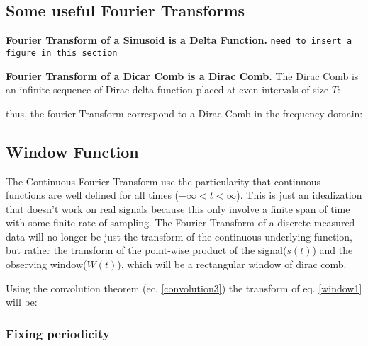\subsection{Some useful Fourier Transforms}{\label{subsec_ftusefull}}
\begin{description}
	\item \textbf{Fourier Transform of a Sinusoid is a Delta Function.} \texttt{need to insert a figure in this section}
	
	\item \textbf{Fourier Transform of a Dicar Comb is a Dirac Comb.} The Dirac Comb is an infinite sequence of Dirac delta function placed at even intervals of size $T$:	

	
	thus, the fourier Transform correspond to a Dirac Comb in the frequency domain:
	

\end{description}

\subsection{Window Function}{\label{subsec_window}}
\newp The Continuous Fourier Transform use the particularity that continuous functions are well defined for all times ($-\infty < t < \infty$). This is just an idealization that doesn't work on real signals because this only involve a finite span of time with some finite rate of sampling. The Fourier Transform of a discrete measured data will no longer be just the transform of the continuous underlying function, but rather the transform of the point-wise product of the signal($s(t)$) and the observing window($W(t)$), which will be a rectangular window of dirac comb.


\newp Using the convolution theorem (ec. \ref{convolution3}) the transform of eq. \ref{window1} will be:

\insertequation[\label{window2}]{\FF[s_{obs}(t)] = \FF[s(t)] * \FF[W(t)]}

\subsubsection{Fixing periodicity}{\label{subsubsec_fixperiod}}

